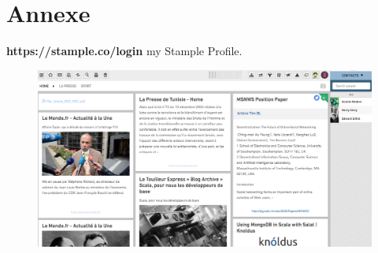 \chapter{Annexe}

\textbf{https://stample.co/login} my Stample Profile.
\begin{figure}[H]
        \centering
                \centering
                \includegraphics[width=\textwidth]{Stample.png}
		\caption{}

               
\end{figure}

